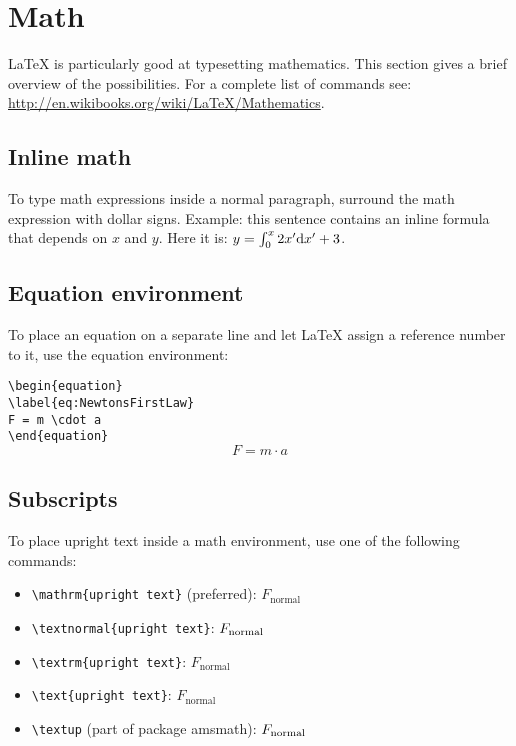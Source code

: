\documentclass{article}
\begin{document}
\section{Math}

\LaTeX{} is particularly good at typesetting mathematics. This section gives a brief overview of the possibilities. For a complete list of commands see: \url{http://en.wikibooks.org/wiki/LaTeX/Mathematics}.

\subsection{Inline math}

To type math expressions inside a normal paragraph, surround the math expression with dollar signs. Example: this sentence contains an inline formula that depends on $x$ and $y$. Here it is: $y=\int_{0}^{x} 2x'\textnormal{d}x'+3 $.


\subsection{Equation environment}

To place an equation on a separate line and let \LaTeX{} assign a reference number to it, use the equation environment:
\vspace{1em}

\noindent\verb|\begin{equation}|\\
\verb|\label{eq:NewtonsFirstLaw}|\\
\verb|F = m \cdot a|\\
\verb|\end{equation}|\\

\begin{equation}
\label{eq:NewtonsFirstLaw}
F = m \cdot a
\end{equation}

\subsection{Subscripts}

To place upright text inside a math environment, use one of the following commands:

\begin{itemize}
	\item \verb|\mathrm{upright text}| (preferred): $F_\mathrm{normal}$
	\item \verb|\textnormal{upright text}|: $F_\textnormal{normal}$
	\item \verb|\textrm{upright text}|: $F_\textrm{normal}$
	\item \verb|\text{upright text}|: $F_\text{normal}$
	\item \verb|\textup| (part of package amsmath): $F_\textup{normal}$
\end{itemize}
\end{document}
